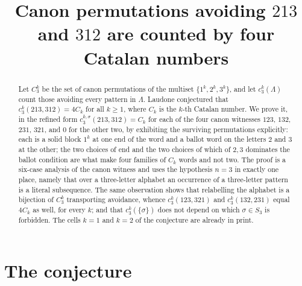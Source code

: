 \documentclass[11pt]{amsart}
\title[Canon permutations avoiding $213$ and $312$]
{Canon permutations avoiding $213$ and $312$ are counted by four Catalan
numbers}
\date{}
\theoremstyle{definition}
\newcommand{\Cat}{C}
\begin{document}
\begin{abstract}
Let $C_3^k$ be the set of canon permutations of the multiset
$\{1^k,2^k,3^k\}$, and let $c_3^k(\Lambda)$ count those avoiding every
pattern in $\Lambda$. Laudone conjectured that
$c_3^k(213,312)=4\Cat_k$ for all $k\ge 1$, where $\Cat_k$ is the $k$-th
Catalan number. We prove it, in the refined form
$c_3^{k,\sigma}(213,312)=\Cat_k$ for each of the four canon
witnesses $123$, $132$, $231$, $321$, and $0$ for the other two, by
exhibiting the surviving permutations explicitly: each is a solid block
$1^k$ at one end of the word and a ballot word on the letters $2$ and $3$ at
the other; the two choices of end and the two choices of which of $2,3$
dominates the ballot condition are what make four families of $\Cat_k$
words and not two. The proof is a six-case analysis of the canon witness and uses
the hypothesis $n=3$ in exactly one place, namely that over a three-letter
alphabet an occurrence of a three-letter pattern is a literal subsequence.
The same observation shows that relabelling the alphabet is a bijection of
$C_3^k$ transporting avoidance, whence $c_3^k(123,321)$ and
$c_3^k(132,231)$ equal $4\Cat_k$ as well, for every $k$; and that
$c_3^k(\{\sigma\})$ does not depend on which $\sigma\in S_3$ is forbidden.
The cells $k=1$ and $k=2$ of the conjecture are already in print.
\end{abstract}

\maketitle

\section{The conjecture}
\end{document}
